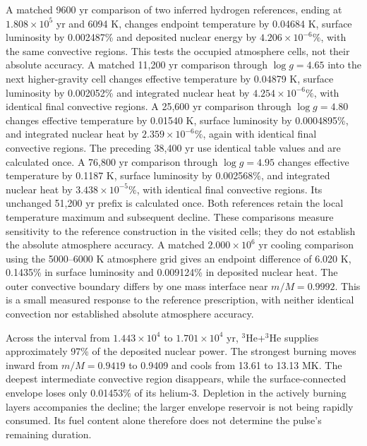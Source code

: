 \documentclass[11pt,letterpaper]{article}
\begin{document}
A matched 9600 yr comparison of two inferred hydrogen references, ending
at $1.808\times10^5$ yr and 6094 K, changes endpoint temperature by
0.04684 K, surface luminosity by 0.002487\% and deposited nuclear energy
by $4.206\times10^{-6}\%$, with the same convective regions.
This tests the occupied atmosphere cells, not their absolute accuracy.
A matched 11,200 yr comparison through $\log g=4.65$ into the next
higher-gravity cell changes effective temperature by 0.04879 K,
surface luminosity by 0.002052\% and integrated nuclear heat by
$4.254\times10^{-6}\%$, with identical final convective regions.
A 25,600 yr comparison through $\log g=4.80$ changes effective temperature
by 0.01540 K, surface luminosity by 0.0004895\%, and integrated nuclear
heat by $2.359\times10^{-6}\%$, again with identical final convective regions.
The preceding 38,400 yr use identical table values and are calculated once.
A 76,800 yr comparison through $\log g=4.95$ changes effective
temperature by 0.1187 K, surface luminosity by 0.002568\%, and integrated
nuclear heat by $3.438\times10^{-5}\%$, with identical final convective regions.
Its unchanged 51,200 yr prefix is calculated once. Both references retain
the local temperature maximum and subsequent decline.
These comparisons measure sensitivity to the reference construction in the
visited cells; they do not establish the absolute atmosphere accuracy.
A matched $2.000\times10^6$ yr cooling comparison using the
5000--6000 K atmosphere grid gives an endpoint difference of 6.020 K,
0.1435\% in surface luminosity and 0.009124\% in deposited nuclear heat.
The outer convective boundary differs by one mass interface near
$m/M=0.9992$. This is a small measured response to the reference prescription,
with neither identical convection nor established absolute atmosphere accuracy.

Across the interval from $1.443\times10^4$ to $1.701\times10^4$ yr,
$^3$He+$^3$He supplies approximately 97\% of the deposited nuclear power.
The strongest burning moves inward from $m/M=0.9419$ to 0.9409 and cools
from 13.61 to 13.13 MK. The deepest intermediate convective region disappears,
while the surface-connected envelope loses only 0.01453\% of its helium-3.
Depletion in the actively burning layers accompanies the decline; the larger
envelope reservoir is not being rapidly consumed. Its fuel content alone
therefore does not determine the pulse's remaining duration.
\end{document}
